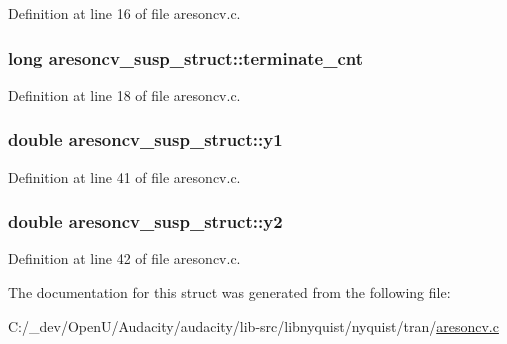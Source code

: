 Definition at line 16 of file aresoncv.\+c.

\subsubsection[{\texorpdfstring{terminate\+\_\+cnt}{terminate_cnt}}]{\setlength{\rightskip}{0pt plus 5cm}long aresoncv\+\_\+susp\+\_\+struct\+::terminate\+\_\+cnt}\hypertarget{structaresoncv__susp__struct_a093aba7a8863f727ef5d62b7e30d554f}{}\label{structaresoncv__susp__struct_a093aba7a8863f727ef5d62b7e30d554f}


Definition at line 18 of file aresoncv.\+c.

\subsubsection[{\texorpdfstring{y1}{y1}}]{\setlength{\rightskip}{0pt plus 5cm}double aresoncv\+\_\+susp\+\_\+struct\+::y1}\hypertarget{structaresoncv__susp__struct_a21f968973e8d736ca28ab4b8b9a4002b}{}\label{structaresoncv__susp__struct_a21f968973e8d736ca28ab4b8b9a4002b}


Definition at line 41 of file aresoncv.\+c.

\subsubsection[{\texorpdfstring{y2}{y2}}]{\setlength{\rightskip}{0pt plus 5cm}double aresoncv\+\_\+susp\+\_\+struct\+::y2}\hypertarget{structaresoncv__susp__struct_a02260f5e9f43df63d9ea52f3f254a0c2}{}\label{structaresoncv__susp__struct_a02260f5e9f43df63d9ea52f3f254a0c2}


Definition at line 42 of file aresoncv.\+c.



The documentation for this struct was generated from the following file\+:\begin{DoxyCompactItemize}
\item 
C\+:/\+\_\+dev/\+Open\+U/\+Audacity/audacity/lib-\/src/libnyquist/nyquist/tran/\hyperlink{aresoncv_8c}{aresoncv.\+c}\end{DoxyCompactItemize}
